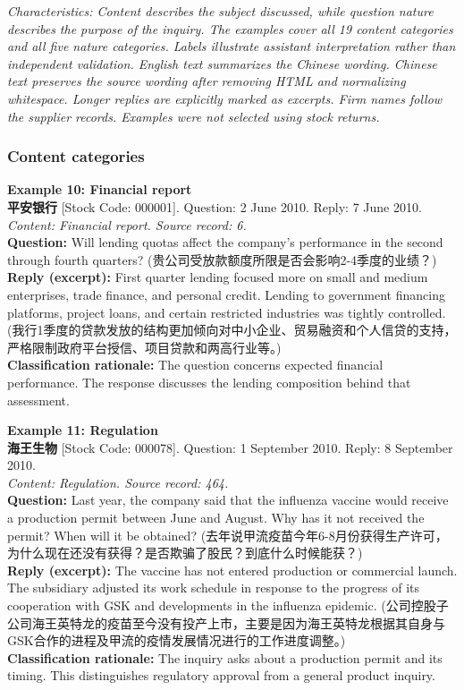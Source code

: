 \textit{Characteristics: Content describes the subject discussed, while question nature describes the purpose of the inquiry. The examples cover all 19 content categories and all five nature categories. Labels illustrate assistant interpretation rather than independent validation. English text summarizes the Chinese wording. Chinese text preserves the source wording after removing HTML and normalizing whitespace. Longer replies are explicitly marked as excerpts. Firm names follow the supplier records. Examples were not selected using stock returns.}

\subsubsection*{Content categories}

\noindent \textbf{Example 10: Financial report} \\
\textbf{平安银行} [Stock Code: 000001]. Question: 2 June 2010. Reply: 7 June 2010. \\
\textit{Content: Financial report. Source record: 6.} \\
\textbf{Question:} Will lending quotas affect the company's performance in the second through fourth quarters? (贵公司受放款额度所限是否会影响2-4季度的业绩？) \\
\textbf{Reply (excerpt):} First quarter lending focused more on small and medium enterprises, trade finance, and personal credit. Lending to government financing platforms, project loans, and certain restricted industries was tightly controlled. (我行1季度的贷款发放的结构更加倾向对中小企业、贸易融资和个人信贷的支持，严格限制政府平台授信、项目贷款和两高行业等。) \\
\textbf{Classification rationale:} The question concerns expected financial performance. The response discusses the lending composition behind that assessment.

\vspace{0.4cm}
\noindent \textbf{Example 11: Regulation} \\
\textbf{海王生物} [Stock Code: 000078]. Question: 1 September 2010. Reply: 8 September 2010. \\
\textit{Content: Regulation. Source record: 464.} \\
\textbf{Question:} Last year, the company said that the influenza vaccine would receive a production permit between June and August. Why has it not received the permit? When will it be obtained? (去年说甲流疫苗今年6-8月份获得生产许可，为什么现在还没有获得？是否欺骗了股民？到底什么时候能获？) \\
\textbf{Reply (excerpt):} The vaccine has not entered production or commercial launch. The subsidiary adjusted its work schedule in response to the progress of its cooperation with GSK and developments in the influenza epidemic. (公司控股子公司海王英特龙的疫苗至今没有投产上市，主要是因为海王英特龙根据其自身与GSK合作的进程及甲流的疫情发展情况进行的工作进度调整。) \\
\textbf{Classification rationale:} The inquiry asks about a production permit and its timing. This distinguishes regulatory approval from a general product inquiry.


